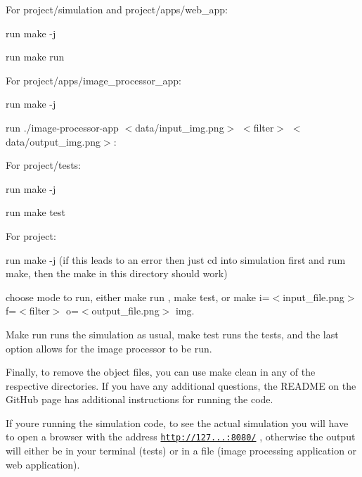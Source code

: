 For project/simulation and project/apps/web\+\_\+app\+:


\begin{DoxyEnumerate}
\item run \textquotesingle{}make -\/j\textquotesingle{}
\item run \textquotesingle{}make run\textquotesingle{}
\end{DoxyEnumerate}

For project/apps/image\+\_\+processor\+\_\+app\+:
\begin{DoxyEnumerate}
\item run \textquotesingle{}make -\/j\textquotesingle{}
\item run \textquotesingle{}./image-\/processor-\/app $<$data/input\+\_\+img.\+png$>$ $<$filter$>$ $<$data/output\+\_\+img.\+png$>$\textquotesingle{}\+:
\end{DoxyEnumerate}

For project/tests\+:
\begin{DoxyEnumerate}
\item run \textquotesingle{}make -\/j\textquotesingle{}
\item run \textquotesingle{}make test\textquotesingle{}
\end{DoxyEnumerate}

For project\+:
\begin{DoxyEnumerate}
\item run \textquotesingle{}make -\/j\textquotesingle{} (if this leads to an error then just cd into simulation first and rum make, then the make in this directory should work)
\item choose mode to run, either \textquotesingle{}make run\textquotesingle{} , \textquotesingle{}make test\textquotesingle{}, or \textquotesingle{}make i=$<$input\+\_\+file.\+png$>$ f=$<$filter$>$ o=$<$output\+\_\+file.\+png$>$ img\textquotesingle{}.
\end{DoxyEnumerate}

Make run runs the simulation as usual, make test runs the tests, and the last option allows for the image processor to be run.

Finally, to remove the object files, you can use make clean in any of the respective directories. If you have any additional questions, the R\+E\+A\+D\+ME on the Git\+Hub page has additional instructions for running the code.

If you\textquotesingle{}re running the simulation code, to see the actual simulation you will have to open a browser with the address \href{http://127.0.0.1:8080/}{\tt http\+://127...\+:8080/} , otherwise the output will either be in your terminal (tests) or in a file (image processing application or web application). 